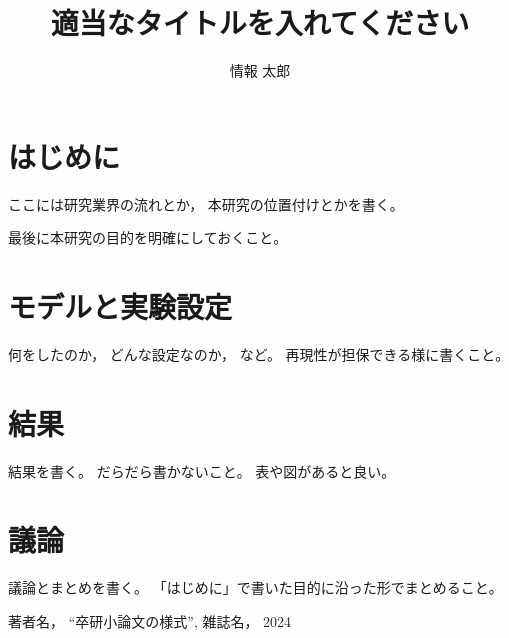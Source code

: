 \documentclass[a4j,twocolumn,uplatex,dvipdfmx]{jsarticle}
\title{適当なタイトルを入れてください}
\subtitle{}
\author{情報 太郎}
\begin{document}
\maketitle
\thispagestyle{empty}
\section{はじめに}

ここには研究業界の流れとか，
本研究の位置付けとかを書く。

最後に本研究の目的を明確にしておくこと。

\section{モデルと実験設定}

何をしたのか， どんな設定なのか， など。
再現性が担保できる様に書くこと。

\section{結果}

結果を書く。
だらだら書かないこと。
表や図があると良い。

\section{議論}

議論とまとめを書く。
「はじめに」で書いた目的に沿った形でまとめること。

\begin{thebibliography}{9}
  著者名， ``卒研小論文の様式'', 雑誌名， 2024

\end{thebibliography}

\end{document}
